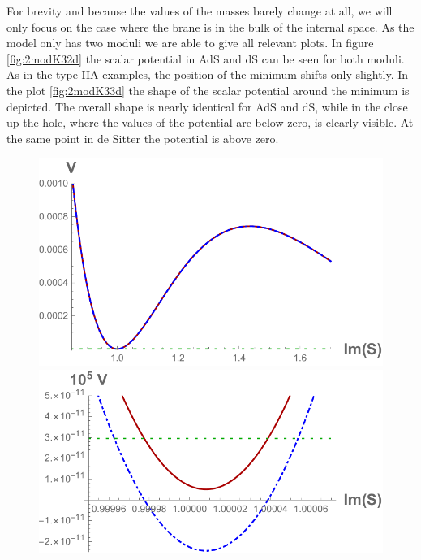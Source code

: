 \documentclass[a4paper,12pt,twoside,openright]{report}
\begin{document}
For brevity and because the values of the masses barely change at all, we will only focus on the case where the brane is in the bulk of the internal space. As the model only has two moduli we are able to give all relevant plots. In figure \ref{fig:2modK32d} the scalar potential in AdS and dS can be seen for both moduli. As in the type IIA examples, the position of the minimum shifts only slightly. In the plot \ref{fig:2modK33d} the shape of the scalar potential around the minimum is depicted. The overall shape is nearly identical for AdS and dS, while in the close up the hole, where the values of the potential are below zero, is clearly visible. At the same point in de Sitter the potential is above zero.

\begin{figure}[htb]
\includegraphics[scale=0.52]{quevedo_314_S_large.pdf}\qquad\includegraphics[scale=0.58]{quevedo_314_S_close.pdf}

\end{figure}
\end{document}
